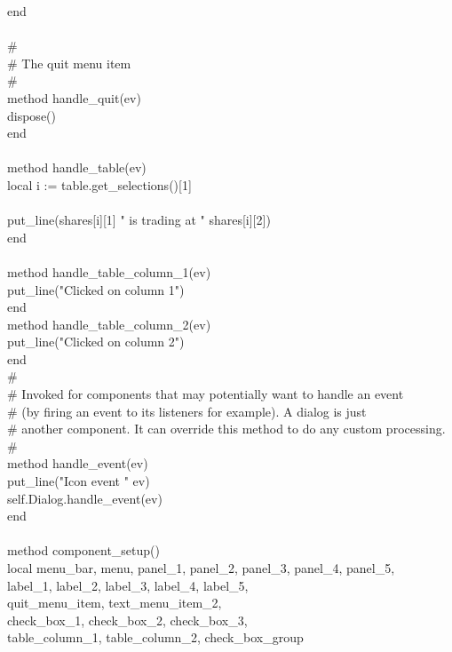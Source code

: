 {\>end \\
\ \\
\>\# \\
\>\# The quit menu item \\
\>\# \\
\>method handle\_quit(ev) \\
\>\>dispose() \\
\>end \\
\ \\
\>method handle\_table(ev) \\
\>\>local i := table.get\_selections()[1] \\
\\
\>\>put\_line(shares[i][1] {\textbar}{\textbar} " is trading at " {\textbar}{\textbar} shares[i][2]) \\
\>end \\
\ \\
\>method handle\_table\_column\_1(ev) \\
\>\>put\_line("Clicked on column 1") \\
\>end \\
\>method handle\_table\_column\_2(ev) \\
\>\>put\_line("Clicked on column 2") \\
\>end
\ \\
\>\# \\
\>\# Invoked for components that may potentially want to handle an event\\
\>\# (by firing an event to its listeners for example). A dialog is just\\
\>\# another component. It can override this method to do any custom processing. \\
\>\# \\
\>method handle\_event(ev) \\
\>\>put\_line("Icon event " {\textbar}{\textbar} ev) \\
\>\>self.Dialog.handle\_event(ev) \\
\>end \\
\ \\
\>method component\_setup() \\
\>\>local menu\_bar, menu, panel\_1, panel\_2, panel\_3, panel\_4, panel\_5, \\
\>\>\>label\_1, label\_2, label\_3, label\_4, label\_5, \\
\>\>\>quit\_menu\_item, text\_menu\_item\_2, \\
\>\>\>check\_box\_1, check\_box\_2, check\_box\_3, \\
\>\>\>table\_column\_1, table\_column\_2, check\_box\_group \\
}
